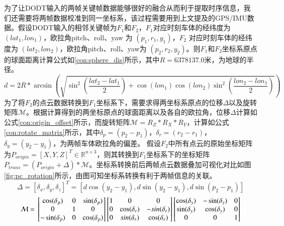 为了让DODT输入的两帧关键帧数据能够很好的融合从而利于提取时序信息，我们还需要将两帧数据校准到同一坐标系，该过程需要用到上文提及的GPS/IMU数据。假设DODT输入的相邻关键帧为$F_1$和$F_2$，$F_1$对应时刻车体的经纬度为 $(lat_1, lon_1)$，欧拉角pitch、roll、yaw 为 $(p_1,r_1,y_1)$，$F_2$ 对应时刻车体的经纬度为 $(lat_2, lon_2)$，欧拉角pitch、roll、yaw为 $(p_2,r_2,y_2)$。则$F_1$和$F_2$坐标系原点的球面距离计算公式如\ref{con:sphere_dis}所示，其中$R=6378137.0$米，为地球的半径。
\begin{equation}
d = 2R * \arcsin(\sqrt{\sin^2(\frac{lat_2 - lat_1}{2}) + \cos(lon_1)\cos(lon_2)\sin^2(\frac{lon_2 - lon_1}{2})})
\label{con:sphere_dis}
\end{equation}
为了将$F_2$的点云数据转换到$F_1$坐标系下，需要求得两坐标系原点的位移$\Delta$以及旋转矩阵$\mathcal{M}$。根据计算得到的两坐标原点的球面距离以及各自的欧拉角，位移$\Delta$计算如公式\ref{con:origin_offset}所示，而旋转矩阵$\mathcal{M} = R_Z * R_X * R_Y$，计算如公式\ref{con:rotate_matrix}所示，其中$\delta_p = (p_2 - p_1)$，$\delta_r = (r_2 - r_1)$，$\delta_y = (y_2 - y_1)$，为两帧车体欧拉角的偏差。 假设$F_2$中所有点云的原始坐标矩阵为$P_{origin} = [X,Y,Z]^T \in \mathbb{R}^{ n \times 3}$，则其转换到$F_1$坐标系下的坐标矩阵$P_{trans} = (P_{origin} + \Delta) * \mathcal{M}$。坐标系转换前后两帧点云数据叠加可视化对比如图\ref{fig:pc_rotation}所示，由图可知坐标系转换有利于两帧信息的关联。 
\begin{equation}
\Delta = [\delta_x, \delta_y, \delta_z]^T = [d\cos(y_2-y_1), d\sin(y_2-y_1),d\sin(p_2-p_1)]
\label{con:origin_offset}
\end{equation}
\begin{equation}
\mathcal{M} = \\
	\begin{bmatrix} 
		\cos(\delta_p) & 0 & \sin(\delta_p)\\
		0 & 1 & 0 \\
		-\sin(\delta_p) & 0 & \cos(\delta_p)
	\end{bmatrix}
	\begin{bmatrix} 
	1 & 0 & 0\\
	0 & \cos(\delta_r) & -sin(\delta_r) \\
	0 & sin(\delta_r) & \cos(\delta_r)
	\end{bmatrix}
	\begin{bmatrix} 
	\cos(\delta_y) & -\sin(\delta_y) & 0\\
	\sin(\delta_y) & \cos(\delta_y) & 0 \\
	0 & 0 & 1
	\end{bmatrix}
\label{con:rotate_matrix}
\end{equation}

